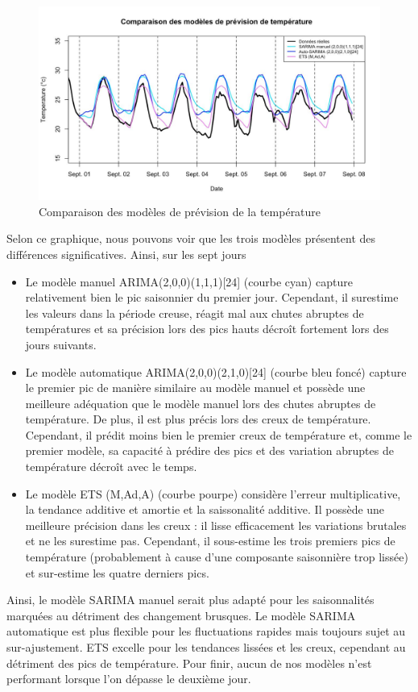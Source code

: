 \documentclass{article}
\theoremstyle{definition}
\theoremstyle{remark}
\begin{document}
\begin{figure}[!h]
    \centering
    \includegraphics[width=0.75\linewidth]{figtemp.jpg}
    \caption{Comparaison des modèles de prévision de la température}
    \label{fig:enter-label}
\end{figure}
Selon ce graphique, nous pouvons voir que les trois modèles présentent des différences significatives. Ainsi, sur les sept jours
\begin{itemize}
    \item Le modèle manuel ARIMA(2,0,0)(1,1,1)[24] (courbe cyan) capture relativement bien le pic saisonnier du premier jour. Cependant, il surestime
les valeurs dans la période creuse, réagit mal aux chutes abruptes de températures et sa précision lors des pics
hauts décroît fortement lors des jours suivants.
\item Le modèle automatique ARIMA(2,0,0)(2,1,0)[24] (courbe bleu foncé) capture le premier pic de manière similaire au modèle manuel et possède une meilleure adéquation que le modèle manuel lors des chutes abruptes de température. De plus, il est plus précis lors des creux de température. Cependant, il prédit moins bien le premier creux de température et, comme le premier modèle, sa capacité à prédire
des pics et des variation abruptes de température décroît avec le temps.
\item Le modèle ETS (M,Ad,A) (courbe pourpe) considère l'erreur multiplicative, la tendance additive et amortie et la saissonalité additive. Il possède une meilleure précision
dans les creux : il lisse efficacement les variations brutales et ne les surestime pas. Cependant, il sous-estime les trois premiers pics de température (probablement à cause d’une composante saisonnière trop lissée) et sur-estime les quatre derniers pics.
\end{itemize} 
Ainsi, le modèle SARIMA manuel serait plus adapté pour les saisonnalités marquées au détriment des changement brusques. Le modèle SARIMA automatique est plus flexible pour les fluctuations rapides mais toujours sujet au sur-ajustement. ETS excelle pour les tendances lissées et les creux, cependant au détriment des pics de température. Pour finir, aucun de nos modèles n’est performant lorsque l’on dépasse le deuxième jour.
\end{document}
